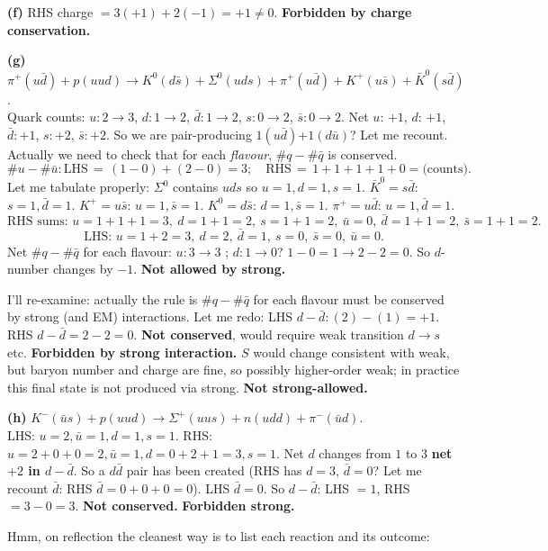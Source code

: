\documentclass[11pt]{article}
\begin{document}
\textbf{(f)} RHS charge $=3(+1)+2(-1)=+1\ne 0$. \textbf{Forbidden by charge conservation.}

\textbf{(g)} $\pi^+(u\bar d)+p(uud)\to K^0(d\bar s)+\Sigma^0(uds)+\pi^+(u\bar d)+K^+(u\bar s)+\bar K^0(s\bar d)$.\\
Quark counts: $u: 2\to 3$, $d:1\to 2$, $\bar d: 1\to 2$, $s: 0\to 2$, $\bar s: 0\to 2$. Net $u$: $+1$, $d$: $+1$, $\bar d:+1$, $s:+2$, $\bar s:+2$. So we are pair-producing $1(u\bar d)$+$1(d\bar u)$? Let me recount. Actually we need to check that for each \emph{flavour}, $\#q-\#\bar q$ is conserved.
\[
\#u-\#\bar u: \mathrm{LHS}\,=\,(1-0)+(2-0)=3;\quad \mathrm{RHS}\,=\,1+1+1+1+0=\textrm{(counts)}.
\]
Let me tabulate properly: $\Sigma^0$ contains $uds$ so $u=1,d=1,s=1$. $\bar K^0=s\bar d$: $s=1,\bar d=1$. $K^+ = u\bar s$: $u=1,\bar s=1$. $K^0=d\bar s$: $d=1,\bar s=1$. $\pi^+=u\bar d$: $u=1,\bar d=1$.
\[
\text{RHS sums: } u=1+1+1=3,\ d=1+1=2,\ s=1+1=2,\ \bar u=0,\ \bar d=1+1=2,\ \bar s=1+1=2.
\]
\[
\text{LHS: } u=1+2=3,\ d=2,\ \bar d=1,\ s=0,\ \bar s=0,\ \bar u=0.
\]
Net $\#q-\#\bar q$ for each flavour: $u: 3\to 3$ \checkmark; $d:1\to 0$? $1-0=1\to 2-2=0$. So $d$-number changes by $-1$. \textbf{Not allowed by strong.}

I'll re-examine: actually the rule is $\#q-\#\bar q$ for each flavour must be conserved by strong (and EM) interactions. Let me redo:
LHS $d-\bar d: (2)-(1)=+1$. RHS $d-\bar d=2-2=0$. \textbf{Not conserved}, would require weak transition $d\to s$ etc. \textbf{Forbidden by strong interaction.} $S$ would change consistent with weak, but baryon number and charge are fine, so possibly higher-order weak; in practice this final state is not produced via strong. \textbf{Not strong-allowed.}

\textbf{(h)} $K^-(\bar u s)+p(uud)\to \Sigma^+(uus)+n(udd)+\pi^-(\bar u d)$.\\
LHS: $u=2,\bar u=1,d=1,s=1$. RHS: $u=2+0+0=2,\bar u=1,d=0+2+1=3,s=1$. Net $d$ changes from $1$ to $3$ \textbf{net $+2$ in $d-\bar d$}. So a $d\bar d$ pair has been created (RHS has $d=3$, $\bar d=0$? Let me recount $\bar d$: RHS $\bar d = 0+0+0=0$). LHS $\bar d=0$. So $d-\bar d$: LHS $=1$, RHS $=3-0=3$. \textbf{Not conserved.} \textbf{Forbidden strong.}

Hmm, on reflection the cleanest way is to list each reaction and its outcome:
\end{document}
